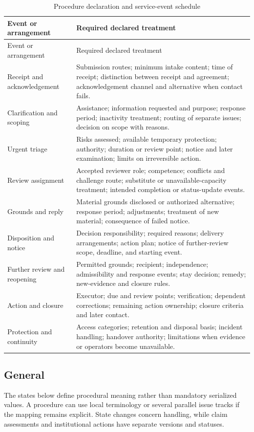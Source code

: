 \documentclass[11pt,a4paper]{article}
\begin{document}
\begin{longtable}{@{}L{0.23\textwidth}L{0.67\textwidth}@{}}
\caption{Procedure declaration and service-event schedule}\label{tab:c210-services}\\
\toprule Event or arrangement & Required declared treatment \\
\midrule\endfirsthead
\toprule Event or arrangement & Required declared treatment \\
\midrule\endhead
Receipt and acknowledgement & Submission routes; minimum intake content; time of receipt; distinction between receipt and agreement; acknowledgement channel and alternative when contact fails. \\
Clarification and scoping & Assistance; information requested and purpose; response period; inactivity treatment; routing of separate issues; decision on scope with reasons. \\
Urgent triage & Risks assessed; available temporary protection; authority; duration or review point; notice and later examination; limits on irreversible action. \\
Review assignment & Accepted reviewer role; competence; conflicts and challenge route; substitute or unavailable-capacity treatment; intended completion or status-update events. \\
Grounds and reply & Material grounds disclosed or authorized alternative; response period; adjustments; treatment of new material; consequence of failed notice. \\
Disposition and notice & Decision responsibility; required reasons; delivery arrangements; action plan; notice of further-review scope, deadline, and starting event. \\
Further review and reopening & Permitted grounds; recipient; independence; admissibility and response events; stay decision; remedy; new-evidence and closure rules. \\
Action and closure & Executor; due and review points; verification; dependent corrections; remaining action ownership; closure criteria and later contact. \\
Protection and continuity & Access categories; retention and disposal basis; incident handling; handover authority; limitations when evidence or operators become unavailable. \\
\bottomrule
\end{longtable}

\subsection{General}
The states below define procedural meaning rather than mandatory serialized values. A procedure can use local terminology or several parallel issue tracks if the mapping remains explicit. State changes concern handling, while claim assessments and institutional actions have separate versions and statuses.
\end{document}
